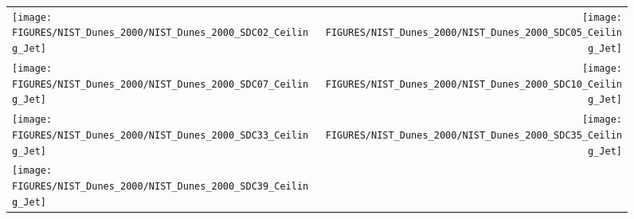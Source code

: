 \begin{figure}[h!]
\begin{tabular*}{\textwidth}{l@{\extracolsep{\fill}}r}
\texttt{[image: FIGURES/NIST\_Dunes\_2000/NIST\_Dunes\_2000\_SDC02\_Ceiling\_Jet]} &
\texttt{[image: FIGURES/NIST\_Dunes\_2000/NIST\_Dunes\_2000\_SDC05\_Ceiling\_Jet]} \\
\texttt{[image: FIGURES/NIST\_Dunes\_2000/NIST\_Dunes\_2000\_SDC07\_Ceiling\_Jet]} &
\texttt{[image: FIGURES/NIST\_Dunes\_2000/NIST\_Dunes\_2000\_SDC10\_Ceiling\_Jet]} \\
\texttt{[image: FIGURES/NIST\_Dunes\_2000/NIST\_Dunes\_2000\_SDC33\_Ceiling\_Jet]} &
\texttt{[image: FIGURES/NIST\_Dunes\_2000/NIST\_Dunes\_2000\_SDC35\_Ceiling\_Jet]} \\
\texttt{[image: FIGURES/NIST\_Dunes\_2000/NIST\_Dunes\_2000\_SDC39\_Ceiling\_Jet]}
\end{tabular*}
\label{NIST_Dunes_2000_Ceiling_Jet}
\end{figure}

\clearpage




